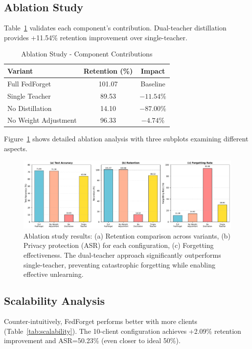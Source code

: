 \documentclass[10pt,twocolumn]{article}
\begin{document}
\subsection{Ablation Study}

Table~\ref{tab:ablation} validates each component's contribution. Dual-teacher distillation provides +11.54\% retention improvement over single-teacher.

\begin{table}[t]
\centering
\caption{Ablation Study - Component Contributions}
\label{tab:ablation}
\begin{tabular}{lcc}
\toprule
Variant & Retention (\%) & Impact \\
\midrule
Full FedForget & 101.07 & Baseline \\
Single Teacher & 89.53 & $-11.54$\% \\
No Distillation & 14.10 & $-87.00$\% \\
No Weight Adjustment & 96.33 & $-4.74$\% \\
\bottomrule
\end{tabular}
\end{table}

Figure~\ref{fig:ablation} shows detailed ablation analysis with three subplots examining different aspects.

\begin{figure}[htbp]
\centering
\includegraphics[width=\columnwidth]{figures/figure2_ablation_study.pdf}
\caption{Ablation study results: (a) Retention comparison across variants, (b) Privacy protection (ASR) for each configuration, (c) Forgetting effectiveness. The dual-teacher approach significantly outperforms single-teacher, preventing catastrophic forgetting while enabling effective unlearning.}
\label{fig:ablation}
\end{figure}

\subsection{Scalability Analysis}

Counter-intuitively, FedForget performs better with more clients (Table~\ref{tab:scalability}). The 10-client configuration achieves +2.09\% retention improvement and ASR=50.23\% (even closer to ideal 50\%).
\end{document}
